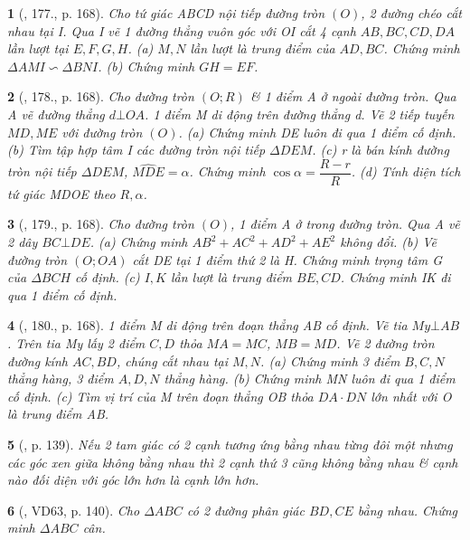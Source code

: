 \documentclass{article}
\newtheorem{baitoan}{}
\begin{document}
\begin{baitoan}[\cite{Tuyen_Toan_9_old}, 177., p. 168]
	Cho tứ giác ABCD nội tiếp đường tròn $(O)$, 2 đường chéo cắt nhau tại I. Qua I vẽ 1 đường thẳng vuôn góc với OI cắt 4 cạnh $AB,BC,CD,DA$ lần lượt tại $E,F,G,H$. (a) $M,N$ lần lượt là trung điểm của $AD,BC$. Chứng minh $\Delta AMI\backsim\Delta BNI$. (b) Chứng minh $GH = EF$.
\end{baitoan}

\begin{baitoan}[\cite{Tuyen_Toan_9_old}, 178., p. 168]
	Cho đường tròn $(O;R)$ \& 1 điểm A ở ngoài đường tròn. Qua A vẽ đường thẳng $d\bot OA$. 1 điểm M di động trên đường thẳng d. Vẽ 2 tiếp tuyến $MD,ME$ với đường tròn $(O)$. (a) Chứng minh DE luôn đi qua 1 điểm cố định. (b) Tìm tập hợp tâm I các đường tròn nội tiếp $\Delta DEM$. (c) r là bán kính đường tròn nội tiếp $\Delta DEM$, $\widehat{MDE} = \alpha$. Chứng minh $\cos\alpha = \dfrac{R - r}{R}$. (d) Tính diện tích tứ giác MDOE theo $R,\alpha$.
\end{baitoan}

\begin{baitoan}[\cite{Tuyen_Toan_9_old}, 179., p. 168]
	Cho đường tròn $(O)$, 1 điểm A ở trong đường tròn. Qua A vẽ 2 dây $BC\bot DE$. (a) Chứng minh $AB^2 + AC^2 + AD^2 + AE^2$ không đổi. (b) Vẽ đường tròn $(O;OA)$ cắt DE tại 1 điểm thứ 2 là H. Chứng minh trọng tâm G của $\Delta BCH$ cố định. (c) $I,K$ lần lượt là trung điểm $BE,CD$. Chứng minh IK đi qua 1 điểm cố định.
\end{baitoan}

\begin{baitoan}[\cite{Tuyen_Toan_9_old}, 180., p. 168]
	1 điểm M di động trên đoạn thẳng AB cố định. Vẽ tia $My\bot AB$. Trên tia My lấy 2 điểm $C,D$ thỏa $MA = MC$, $MB = MD$. Vẽ 2 đường tròn đường kính $AC,BD$, chúng cắt nhau tại $M,N$. (a) Chứng minh 3 điểm $B,C,N$ thẳng hàng, 3 điểm $A,D,N$ thẳng hàng. (b) Chứng minh MN luôn đi qua 1 điểm cố định. (c) Tìm vị trí của M trên đoạn thẳng OB thỏa $DA\cdot DN$ lớn nhất với O là trung điểm AB.
\end{baitoan}

\begin{baitoan}[\cite{Binh_Toan_9_tap_2}, p. 139]
	Nếu 2 tam giác có 2 cạnh tương ứng bằng nhau từng đôi một nhưng các góc xen giữa không bằng nhau thì 2 cạnh thứ 3 cũng không bằng nhau \& cạnh nào đối diện với góc lớn hơn là cạnh lớn hơn.
\end{baitoan}

\begin{baitoan}[\cite{Binh_Toan_9_tap_2}, VD63, p. 140]
	Cho $\Delta ABC$ có 2 đường phân giác $BD,CE$ bằng nhau. Chứng minh $\Delta ABC$ cân.
\end{baitoan}
\end{document}
